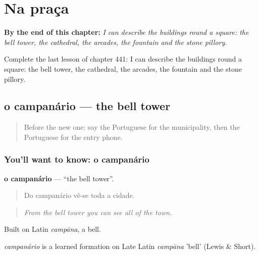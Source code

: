 
\chapter{Na praça}
\label{ch:pt-na-praca}

\begin{chapteropening}
\textbf{By the end of this chapter:} \emph{I can describe the buildings round a square: the bell tower, the cathedral, the arcades, the fountain and the stone pillory.}

Complete the last lesson of chapter 441: I can describe the buildings round a square: the bell tower, the cathedral, the arcades, the fountain and the stone pillory.
\end{chapteropening}

\section[o campanário]{o campanário — the bell tower}

\label{lesson:PT-C441-campanario}



\begin{quote}
Before the new one: say the Portuguese for the municipality, then the Portuguese for the entry phone.
\end{quote}

\subsection*{You'll want to know: o campanário}
\textbf{o campanário} — \textquotedblleft{}the bell tower\textquotedblright{}.

\begin{quote}
Do campanário vê-se toda a cidade.
\end{quote}

\begin{quote}
\emph{From the bell tower you can see all of the town.}
\end{quote}

Built on Latin \emph{campāna}, a bell.

\begin{cousinweb}
\emph{campanário} is a learned formation on Late Latin \emph{campāna} 'bell' (Lewis \& Short).
\end{cousinweb}

